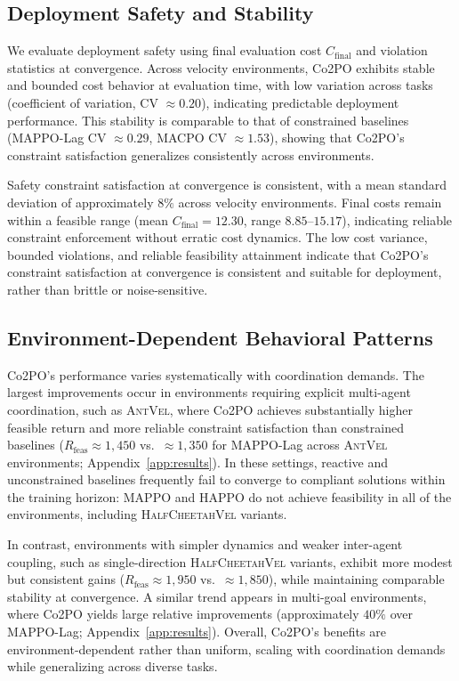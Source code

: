 \documentclass{article}
\theoremstyle{plain}
\theoremstyle{definition}
\theoremstyle{remark}
\begin{document}
\subsection{Deployment Safety and Stability}

We evaluate deployment safety using final evaluation cost $C_{\text{final}}$ and violation statistics at convergence. 
Across velocity environments, Co2PO exhibits stable and bounded cost behavior at evaluation time, with low variation across tasks (coefficient of variation, CV $\approx 0.20$), indicating predictable deployment performance. This stability is comparable to that of constrained baselines (MAPPO-Lag CV $\approx 0.29$, MACPO CV $\approx 1.53$), showing that Co2PO’s constraint satisfaction generalizes consistently across environments.

Safety constraint satisfaction at convergence is consistent, with a mean standard deviation of approximately $8\%$ across velocity environments. 
Final costs remain within a feasible range (mean $C_{\text{final}} = 12.30$, range $8.85$--$15.17$), indicating reliable constraint enforcement without erratic cost dynamics. The low cost variance, bounded violations, and reliable feasibility attainment indicate that Co2PO’s constraint satisfaction at convergence is consistent and suitable for deployment, rather than brittle or noise-sensitive.

\subsection{Environment-Dependent Behavioral Patterns}

Co2PO’s performance varies systematically with coordination demands. The largest improvements occur in environments requiring explicit multi-agent coordination, such as \textsc{AntVel}, where Co2PO achieves substantially higher feasible return and more reliable constraint satisfaction than constrained baselines ($R_{\text{feas}} \approx 1{,}450$ vs.\ $\approx 1{,}350$ for MAPPO-Lag across \textsc{AntVel} environments; Appendix~\ref{app:results}). In these settings, reactive and unconstrained baselines frequently fail to converge to compliant solutions within the training horizon: MAPPO and HAPPO do not achieve feasibility in all of the environments, including \textsc{HalfCheetahVel} variants. 

In contrast, environments with simpler dynamics and weaker inter-agent coupling, such as single-direction \textsc{HalfCheetahVel} variants, exhibit more modest but consistent gains ($R_{\text{feas}} \approx 1{,}950$ vs.\ $\approx 1{,}850$), while maintaining comparable stability at convergence. A similar trend appears in multi-goal environments, where Co2PO yields large relative improvements (approximately $40\%$ over MAPPO-Lag; Appendix~\ref{app:results}). Overall, Co2PO’s benefits are environment-dependent rather than uniform, scaling with coordination demands while generalizing across diverse tasks.
\end{document}
